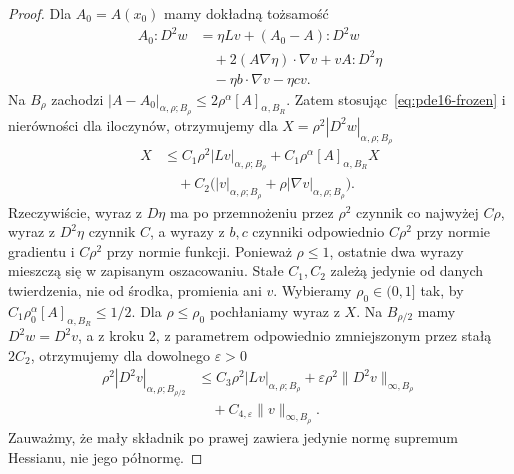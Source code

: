 \begin{proof}
Dla $A_0=A(x_0)$ mamy dokładną tożsamość
\[
 \begin{aligned}
 A_0:D^2w
 &=\eta Lv+(A_0-A):D^2w\\
 &\quad+2(A\nabla\eta)\cdot\nabla v+v A:D^2\eta\\
 &\quad-\eta b\cdot\nabla v-\eta cv .
 \end{aligned}
\]
Na $B_\rho$ zachodzi
$|A-A_0|_{\alpha,\rho;B_\rho}\le2\rho^\alpha[A]_{\alpha,B_R}$.
Zatem stosując~\eqref{eq:pde16-frozen} i nierówności
dla iloczynów, otrzymujemy dla $X=\rho^2|D^2w|_{\alpha,\rho;B_\rho}$
\[
 \begin{aligned}
 X &\le C_1\rho^2|Lv|_{\alpha,\rho;B_\rho}
       +C_1\rho^\alpha[A]_{\alpha,B_R} X\\
   &\quad+C_2\bigl(|v|_{\alpha,\rho;B_\rho}
                         +\rho|\nabla v|_{\alpha,\rho;B_\rho}\bigr).
 \end{aligned}
\]
Rzeczywiście, wyraz z $D\eta$ ma po przemnożeniu
przez $\rho^2$ czynnik co najwyżej $C\rho$,
wyraz z $D^2\eta$ czynnik $C$, a wyrazy z $b,c$
czynniki odpowiednio $C\rho^2$ przy normie gradientu
i $C\rho^2$ przy normie funkcji. Ponieważ $\rho\le1$,
ostatnie dwa wyrazy mieszczą się w zapisanym oszacowaniu.
Stałe $C_1,C_2$ zależą jedynie od danych twierdzenia,
nie od środka, promienia ani $v$.
Wybieramy $\rho_0\in(0,1]$ tak, by
$C_1\rho_0^\alpha[A]_{\alpha,B_R}\le1/2$.
Dla $\rho\le\rho_0$ pochłaniamy wyraz z $X$.
Na $B_{\rho/2}$ mamy $D^2w=D^2v$, a z kroku 2,
z parametrem odpowiednio zmniejszonym przez stałą $2C_2$,
otrzymujemy dla dowolnego $\varepsilon>0$
\[
 \begin{aligned}
 \rho^2|D^2v|_{\alpha,\rho;B_{\rho/2}}
 &\le C_3\rho^2|Lv|_{\alpha,\rho;B_\rho}
     +\varepsilon\rho^2\|D^2v\|_{\infty,B_\rho}\\
 &\quad+C_{4,\varepsilon}\|v\|_{\infty,B_\rho}.
 \end{aligned}
\]
Zauważmy, że mały składnik po prawej zawiera
jedynie normę supremum Hessianu, nie jego półnormę.


\end{proof}

